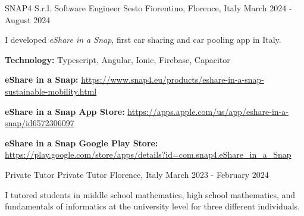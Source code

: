 

\begin{cventries}

  \cventry
    {SNAP4 S.r.l.} %
    {Software Engineer} %
    {Sesto Fiorentino, Florence, Italy} %
    {March 2024 - August 2024} %
    {
      \begin{cvitems} %
        \item {I developed \textit{eShare in a Snap}, first car sharing and car pooling app in Italy.}
        \item {\textbf{Technology:} Typescript, Angular, Ionic, Firebase, Capacitor}
        \item {\textbf{eShare in a Snap:} \href{https://www.snap4.eu/products/eshare-in-a-snap-sustainable-mobility.html}{https://www.snap4.eu/products/eshare-in-a-snap-sustainable-mobility.html}}
        \item {\textbf{eShare in a Snap App Store:} \href{https://apps.apple.com/us/app/eshare-in-a-snap/id6572306097}{https://apps.apple.com/us/app/eshare-in-a-snap/id6572306097}}
        \item {\textbf{eShare in a Snap Google Play Store:} \href{https://play.google.com/store/apps/details?id=com.snap4.eShare_in_a_Snap&hl=en}{https://play.google.com/store/apps/details?id=com.snap4.eShare\_in\_a\_Snap}}
      \end{cvitems}
    }

  \cventry
    {Private Tutor} %
    {Private Tutor} %
    {Florence, Italy} %
    {March 2023 - February 2024} %
    {
      \begin{cvitems} %
        \item {I tutored students in middle school mathematics, high school mathematics, and fundamentals of informatics at the university level for three diﬀerent individuals.}
      \end{cvitems}
    }


\end{cventries}
